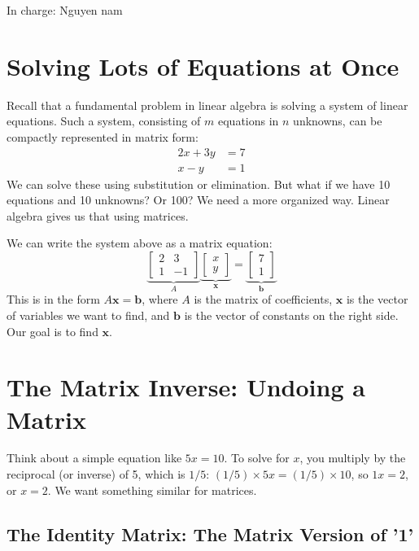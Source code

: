 \documentclass[11pt]{article}
\newcommand{\x}{\mathbf{x}}
\newcommand{\bb}{\mathbf{b}}
\begin{document}



In charge: Nguyen nam

\section{Solving Lots of Equations at Once}

Recall that a fundamental problem in linear algebra is solving a system of linear equations. Such a system, consisting of $m$ equations in $n$ unknowns, can be compactly represented in matrix form:
\begin{align*}
    2x + 3y &= 7 \\
    x - y &= 1
\end{align*}
We can solve these using substitution or elimination. But what if we have 10 equations and 10 unknowns? Or 100? We need a more organized way. Linear algebra gives us that using matrices.

We can write the system above as a matrix equation:
\[ \underbrace{\begin{bmatrix} 2 & 3 \\ 1 & -1 \end{bmatrix}}_{A} \underbrace{\begin{bmatrix} x \\ y \end{bmatrix}}_{\x} = \underbrace{\begin{bmatrix} 7 \\ 1 \end{bmatrix}}_{\bb} \]
This is in the form $A\x = \bb$, where $A$ is the matrix of coefficients, $\x$ is the vector of variables we want to find, and $\bb$ is the vector of constants on the right side. Our goal is to find $\x$.

\section{The Matrix Inverse: Undoing a Matrix}

Think about a simple equation like $5x = 10$. To solve for $x$, you multiply by the reciprocal (or inverse) of 5, which is $1/5$: $(1/5) \times 5x = (1/5) \times 10$, so $1x = 2$, or $x=2$. We want something similar for matrices.

\subsection{The Identity Matrix: The Matrix Version of '1'}
\end{document}
